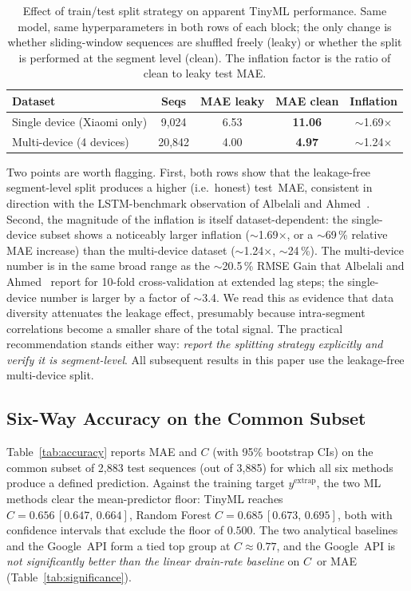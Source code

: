 \documentclass[conference]{IEEEtran}
\begin{document}
\begin{table}[t]
\caption{Effect of train/test split strategy on apparent TinyML
performance. Same model, same hyperparameters in both rows of each
block; the only change is whether sliding-window sequences are
shuffled freely (leaky) or whether the split is performed at the
segment level (clean). The inflation factor is the ratio of clean to
leaky test MAE.}
\label{tab:leakage}
\centering
\footnotesize
\setlength{\tabcolsep}{3pt}
\begin{tabular}{lcccc}
\toprule
Dataset & Seqs & MAE leaky & MAE clean & Inflation \\
\midrule
Single device (Xiaomi only)  & \phantom{0}9{,}024 & 6.53 & \textbf{11.06} & $\sim$1.69$\times$ \\
Multi-device (4 devices)     & 20{,}842 & 4.00 & \textbf{4.97} & $\sim$1.24$\times$ \\
\bottomrule
\end{tabular}
\end{table}

Two points are worth flagging. First, both rows show that the
leakage-free segment-level split produces a higher (i.e.\ honest)
test~MAE, consistent in direction with the LSTM-benchmark observation
of Albelali and Ahmed~\cite{albelali2025hidden}. Second, the
magnitude of the inflation is itself dataset-dependent: the
single-device subset shows a noticeably larger inflation
($\sim$1.69$\times$, or a $\sim$69\,\% relative MAE increase) than
the multi-device dataset ($\sim$1.24$\times$, $\sim$24\,\%). The
multi-device number is in the same broad range as the
$\sim$20.5\,\% RMSE Gain that Albelali and
Ahmed~\cite{albelali2025hidden} report for 10-fold cross-validation
at extended lag steps; the single-device number is larger by a factor
of $\sim$3.4. We read this as evidence that data diversity attenuates
the leakage effect, presumably because intra-segment correlations
become a smaller share of the total signal. The practical
recommendation stands either way: \emph{report the splitting strategy
explicitly and verify it is segment-level}. All subsequent results in
this paper use the leakage-free multi-device split.

\subsection{Six-Way Accuracy on the Common Subset}
Table~\ref{tab:accuracy} reports MAE and $C$ (with 95\% bootstrap CIs)
on the common subset of 2{,}883 test sequences (out of 3{,}885) for
which all six methods produce a defined prediction. Against the
training target $y^{\text{extrap}}$, the two ML methods clear the
mean-predictor floor: TinyML reaches $C{=}0.656\,[0.647,\,0.664]$,
Random Forest $C{=}0.685\,[0.673,\,0.695]$, both with confidence
intervals that exclude the floor of $0.500$. The two analytical
baselines and the Google~API form a tied top group at $C \approx 0.77$,
and the Google~API is \emph{not significantly better than the linear
drain-rate baseline} on $C$~or MAE
(Table~\ref{tab:significance}).
\end{document}
